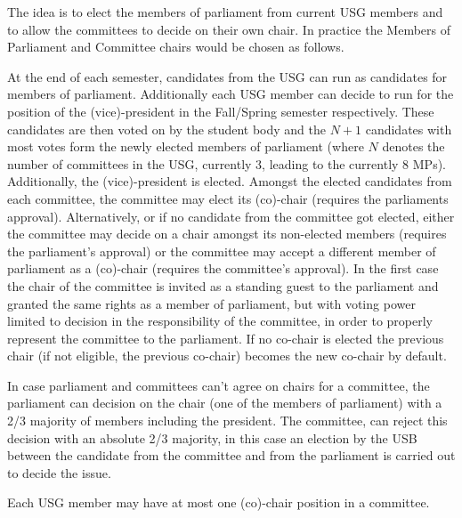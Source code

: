 The idea is to elect the members of parliament from current USG members and to allow the committees to decide on their own chair. 
In practice the Members of Parliament and Committee chairs would be chosen as follows. 

At the end of each semester, candidates from the USG can run as candidates for members of parliament. Additionally each USG member can decide to run for the position of the (vice)-president in the Fall/Spring semester respectively. These candidates are then voted on by the student body and the $N+1$ candidates with most votes form the newly elected members of parliament (where $N$ denotes the number of committees in the USG, currently 3, leading to the currently 8 MPs). Additionally, the (vice)-president is elected. Amongst the elected candidates from each committee, the committee may elect its (co)-chair (requires the parliaments approval). Alternatively, or if no candidate from the committee got elected, either the committee may decide on a chair amongst its non-elected members (requires the parliament's approval) or the committee may accept a different member of parliament as a (co)-chair (requires the committee's approval). In the first case the chair of the committee is invited as a standing guest to the parliament and granted the same rights as a member of parliament, but with voting power limited to decision in the responsibility of the committee, in order to properly represent the committee to the parliament. If no co-chair is elected the previous chair (if not eligible, the previous co-chair) becomes the new co-chair by default.

In case parliament and committees can't agree on chairs for a committee, the parliament can decision on the chair (one of the members of parliament) with a 2/3 majority of members including the president. The committee, can reject this decision with an absolute 2/3 majority, in this case an election by the USB between the candidate from the committee and from the parliament is carried out to decide the issue. 

Each USG member may have at most one (co)-chair position in a committee.